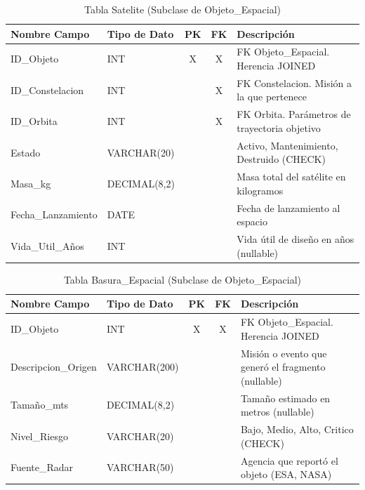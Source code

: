 \begin{table}[H]
\centering
\footnotesize
\begin{tabular}{|l|l|c|c|p{5cm}|}
\hline
\textbf{Nombre Campo} & \textbf{Tipo de Dato} & \textbf{PK} & \textbf{FK} & \textbf{Descripción} \\
\hline
ID\_Objeto & INT & X & X & FK Objeto\_Espacial. Herencia JOINED \\
\hline
ID\_Constelacion & INT & & X & FK Constelacion. Misión a la que pertenece \\
\hline
ID\_Orbita & INT & & X & FK Orbita. Parámetros de trayectoria objetivo \\
\hline
Estado & VARCHAR(20) & & & Activo, Mantenimiento, Destruido (CHECK) \\
\hline
Masa\_kg & DECIMAL(8,2) & & & Masa total del satélite en kilogramos \\
\hline
Fecha\_Lanzamiento & DATE & & & Fecha de lanzamiento al espacio \\
\hline
Vida\_Util\_Años & INT & & & Vida útil de diseño en años (nullable) \\
\hline
\end{tabular}
\caption{Tabla Satelite (Subclase de Objeto\_Espacial)}
\end{table}

\begin{table}[H]
\centering
\footnotesize
\begin{tabular}{|l|l|c|c|p{5cm}|}
\hline
\textbf{Nombre Campo} & \textbf{Tipo de Dato} & \textbf{PK} & \textbf{FK} & \textbf{Descripción} \\
\hline
ID\_Objeto & INT & X & X & FK Objeto\_Espacial. Herencia JOINED \\
\hline
Descripcion\_Origen & VARCHAR(200) & & & Misión o evento que generó el fragmento (nullable) \\
\hline
Tamaño\_mts & DECIMAL(8,2) & & & Tamaño estimado en metros (nullable) \\
\hline
Nivel\_Riesgo & VARCHAR(20) & & & Bajo, Medio, Alto, Critico (CHECK) \\
\hline
Fuente\_Radar & VARCHAR(50) & & & Agencia que reportó el objeto (ESA, NASA) \\
\hline
\end{tabular}
\caption{Tabla Basura\_Espacial (Subclase de Objeto\_Espacial)}
\end{table}

